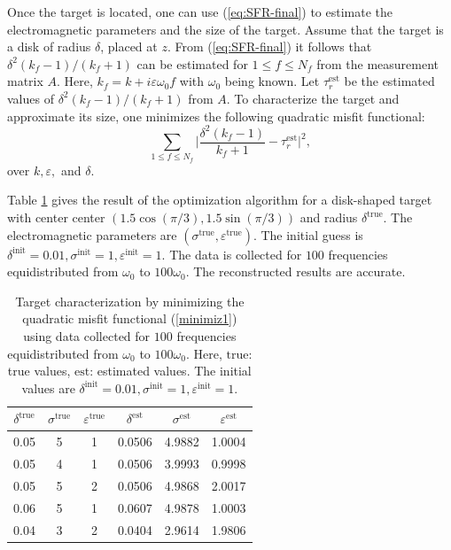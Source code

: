 Once the target is located, one can use (\ref{eq:SFR-final}) to
estimate the electromagnetic parameters and the size of the
target. Assume that the target is a disk of radius $\delta$,
placed at $z$. From (\ref{eq:SFR-final}) it follows that
$\delta^2(k_f-1)/(k_f+1)$ can be estimated for $ 1\leq f \leq N_f$
from the measurement matrix $A$. Here, $k_f = k+i\varepsilon
\omega_0 f$ with $\omega_0$ being known. Let $\tau_r^{\mbox
{est}}$ be the estimated values of $\delta^2(k_f-1)/(k_f+1)$ from
$A$. To characterize the target and approximate its size, one
minimizes the following quadratic misfit functional:
\begin{equation} \label{minimiz1}
\sum_{1 \leq f\leq N_f} \bigg| \frac{\delta^2(k_f-1)}{k_f+1} -
\tau_r^{\mbox {est}} \bigg|^2,
\end{equation}
over $k, \varepsilon,$ and $\delta$.

Table \ref{table2} gives the result of the optimization algorithm
for a disk-shaped target with center center
$(1.5\cos(\pi/3),1.5\sin(\pi/3))$ and radius $\delta^{\textrm{true}}$. The electromagnetic parameters are $(\sigma^{{\textrm{true}}},
\varepsilon^{{\textrm{true}}})$. The initial guess is $\delta^{\textrm{init}} = 0.01, \sigma^{{\textrm{init}}} = 1, \varepsilon^{{\textrm{init}}}
=1.$ The data is collected for $100$ frequencies  equidistributed
from $\omega_0$ to $100 \omega_0$. The reconstructed results are
accurate.

\begin{table}[!h]
\centering
\begin{tabular}{|c|c|c||c|c|c|}
\hline $\delta^{{\textrm{true}}}$ & $\sigma^{{\textrm{true}}}$ &
$\varepsilon^{{\textrm{true}}}$ & $\delta^{{\textrm{est}}}$ & $\sigma^{\textrm{est}}$
 & $\varepsilon^{{\textrm{est}}}$\tabularnewline \hline 0.05 & 5
& 1 & 0.0506 & 4.9882 & 1.0004\tabularnewline \hline 0.05 & 4 & 1
& 0.0506 & 3.9993 & 0.9998\tabularnewline \hline 0.05 & 5 & 2 &
0.0506 & 4.9868 & 2.0017\tabularnewline \hline 0.06 & 5 & 1 &
0.0607 & 4.9878 & 1.0003\tabularnewline \hline 0.04 & 3 & 2 &
0.0404 & 2.9614 & 1.9806\tabularnewline \hline
\end{tabular}

\caption{Target characterization by minimizing the quadratic
misfit functional (\ref{minimiz1}) using data collected for $100$
frequencies equidistributed from $\omega_0$ to $100 \omega_0$.
Here, ${\textrm{true}}$: true values, ${\textrm{est}}$: estimated values.
The initial values are $\delta^{{\textrm{init}}} = 0.01, \sigma^{\textrm{init}} = 1,
 \varepsilon^{{\textrm{init}}} =1.$ \label{table2}}
\end{table}

